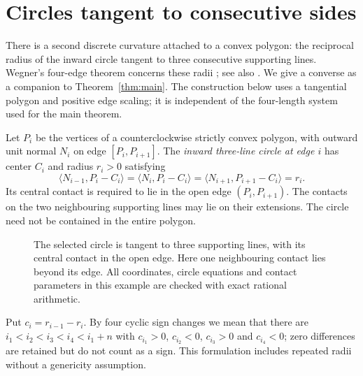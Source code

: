 \section{Circles tangent to consecutive sides}\label{sec:side-tangent}

There is a second discrete curvature attached to a convex polygon: the
reciprocal radius of the inward circle tangent to three consecutive
supporting lines. Wegner's four-edge theorem concerns these radii
\cite[Theorem~1]{Wegner1994}; see also \cite[Corollary~21.11]{Pak2010}. We give a converse as a companion to
Theorem~\ref{thm:main}. The construction below uses a tangential polygon and
positive edge scaling; it is independent of the four-length system used for
the main theorem.

\begin{definition}\label{def:side-tangent-circle}
Let $P_i$ be the vertices of a counterclockwise strictly convex polygon,
with outward unit normal $N_i$ on edge $[P_i,P_{i+1}]$.
The \emph{inward three-line circle at edge $i$} has center $C_i$ and radius
$r_i>0$ satisfying
\begin{equation}\label{eq:side-tangent-distances}
 \langle N_{i-1},P_i-C_i\rangle
 =\langle N_i,P_i-C_i\rangle
 =\langle N_{i+1},P_{i+1}-C_i\rangle=r_i.
\end{equation}
Its central contact is required to lie in the open edge $(P_i,P_{i+1})$.
The contacts on the two neighbouring supporting lines may lie on their
extensions. The circle need not be contained in the entire polygon.
\end{definition}

\begin{figure}[htbp]
\centering
{}
\caption{The selected circle is tangent to three supporting lines, with
its central contact in the open edge. Here one neighbouring contact lies
beyond its edge. All coordinates, circle equations and contact parameters
in this example are checked with exact rational arithmetic.}
\label{fig:side-tangent-circle}
\end{figure}

Put $c_i=r_{i-1}-r_i$. By four cyclic sign changes we mean that there are
$i_1<i_2<i_3<i_4<i_1+n$ with
$c_{i_1}>0$, $c_{i_2}<0$, $c_{i_3}>0$ and $c_{i_4}<0$; zero differences are
retained but do not count as a sign. This formulation includes repeated
radii without a genericity assumption.

